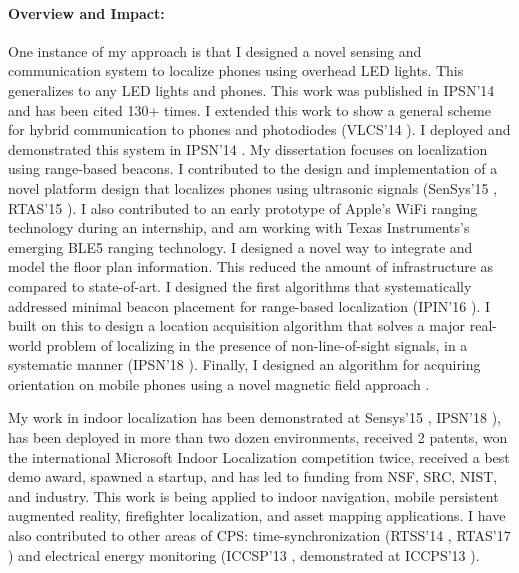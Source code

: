 \documentclass[10pt]{article}
\begin{document}
\paragraph{Overview and Impact: }
One instance of my approach is that I designed a novel sensing and communication system to localize phones using overhead LED lights. This generalizes to any LED lights and phones. This work was published in IPSN'14 \cite{rajagopal2014visual} and has been
cited 130+ times. I extended this work to show a general scheme for hybrid communication to phones and photodiodes (VLCS'14 \cite{rajagopal2014hybrid}). I deployed and demonstrated this system in IPSN'14 \cite{rajagopal2014demonstration}. My dissertation focuses on localization using range-based beacons. I contributed to the design and implementation of a novel platform design that localizes phones using ultrasonic signals (SenSys'15 \cite{lazik2015alps},
RTAS'15 \cite{rtas-alps-platform}). I also contributed to an early prototype of Apple's WiFi ranging technology during an internship, and am working with Texas Instruments's emerging BLE5 ranging technology. %
I designed a novel way to integrate and model the floor plan information. This reduced the amount of infrastructure as compared to state-of-art. I designed the first algorithms that systematically addressed minimal beacon placement for range-based localization (IPIN'16 \cite{rajagopal2016beacon}). I built on this to design a location acquisition algorithm that solves a major real-world problem of localizing in the presence of non-line-of-sight signals, in a systematic manner (IPSN'18 \cite{rajagopal2018enhancing}). Finally, I designed an algorithm for acquiring orientation on mobile phones using a novel magnetic field approach \cite{mobileAR}.  

My work in indoor localization has been demonstrated at
Sensys'15 \cite{lazik2015alpsdemo}, IPSN'18 \cite{rajagopal2018welcome}), has been deployed in more than two dozen environments, received 2 patents, won the international
Microsoft Indoor Localization competition twice, received a best demo
award, spawned a startup, and has led to funding from NSF, SRC, NIST, and
industry. This work is being applied to indoor navigation, mobile
persistent augmented reality, firefighter localization, and asset
mapping applications.  I have also contributed to other areas of CPS:
time-synchronization (RTSS'14 \cite{buevich2013hardware}, RTAS'17 \cite{dongare2017pulsar}) and electrical energy
monitoring (ICCSP'13 \cite{rajagopal2013magnetic}, demonstrated at ICCPS'13 \cite{rajagopal2013demo}).
\end{document}
